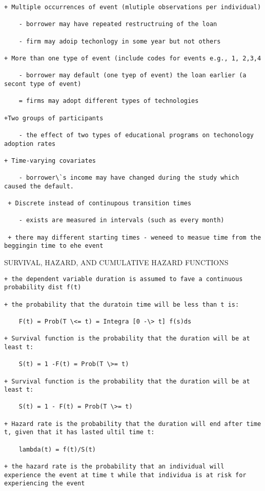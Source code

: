 \documentclass[
]{book}
\begin{document}
\begin{verbatim}
+ Multiple occurrences of event (mlutiple observations per individual)

    - borrower may have repeated restructruing of the loan

    - firm may adoip techonlogy in some year but not others

+ More than one type of event (include codes for events e.g., 1, 2,3,4

    - borrower may default (one tyep of event) the loan earlier (a secont type of event)

    = firms may adopt different types of technologies

+Two groups of participants

    - the effect of two types of educational programs on techonology adoption rates

+ Time-varying covariates

    - borrower\`s income may have changed during the study which caused the default.

 + Discrete instead of continupous transition times

    - exists are measured in intervals (such as every month)

 + there may different starting times - weneed to measue time from the beggingin time to ehe event
\end{verbatim}

SURVIVAL, HAZARD, AND CUMULATIVE HAZARD FUNCTIONS

\begin{verbatim}
+ the dependent variable duration is assumed to fave a continuous probability dist f(t)

+ the probability that the duratoin time will be less than t is:

    F(t) = Prob(T \<= t) = Integra [0 -\> t] f(s)ds

+ Survival function is the probability that the duration will be at least t:

    S(t) = 1 -F(t) = Prob(T \>= t)

+ Survival function is the probability that the duration will be at least t:

    S(t) = 1 - F(t) = Prob(T \>= t)

+ Hazard rate is the probability that the duration will end after time t, given that it has lasted ultil time t:

    lambda(t) = f(t)/S(t)

+ the hazard rate is the probability that an individual will experience the event at time t while that individua is at risk for experiencing the event
\end{verbatim}
\end{document}
